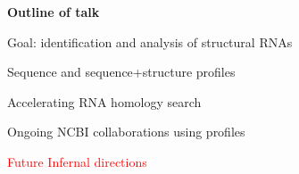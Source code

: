 \documentclass[landscape]{slides}
\begin{document}



\begin{slide}
\begin{center}
\textbf{Outline of talk}

\small
\begin{description}
\item[1.] Goal: identification and analysis of structural RNAs
\item[2.] Sequence and sequence+structure profiles
\item[3.] Accelerating RNA homology search
\item[4.] Ongoing NCBI collaborations using profiles
\textcolor{red}{\item[5.] Future Infernal directions}
\end{description}

\end{center}
\vfill
\end{slide}





\end{document}
